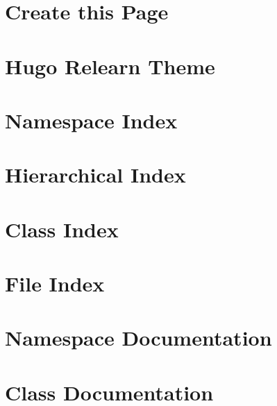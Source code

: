 \let\mypdfximage\pdfximage\def\pdfximage{\immediate\mypdfximage}\documentclass[twoside]{book}
\newcommand{\+}{\discretionary{\mbox{\scriptsize$\hookleftarrow$}}{}{}}
\begin{document}
\chapter{Create this Page}
\label{md_themes_relearn_layouts_partials_initial}

\chapter{Hugo Relearn Theme}
\label{md_themes_relearn_README}

\chapter{Namespace Index}

\chapter{Hierarchical Index}

\chapter{Class Index}

\chapter{File Index}

\chapter{Namespace Documentation}

\chapter{Class Documentation}









































\end{document}
